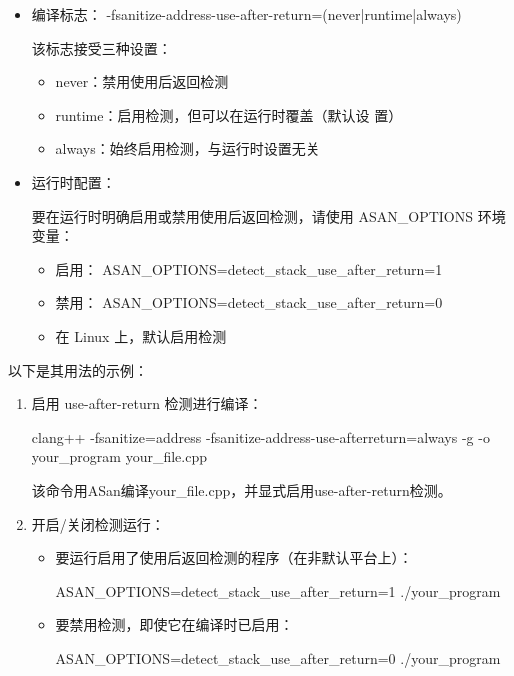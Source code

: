 \begin{itemize}
\item
编译标志： -fsanitize-address-use-after-return=(never|runtime|always)

该标志接受三种设置：

\begin{itemize}
\item
never：禁用使用后返回检测

\item
runtime：启用检测，但可以在运行时覆盖（默认设
置）

\item
always：始终启用检测，与运行时设置无关
\end{itemize}

\item
运行时配置：

要在运行时明确启用或禁用使用后返回检测，请使用 ASAN\_OPTIONS 环境变量：

\begin{itemize}
\item
启用： ASAN\_OPTIONS=detect\_stack\_use\_after\_return=1

\item
禁用： ASAN\_OPTIONS=detect\_stack\_use\_after\_return=0

\item
在 Linux 上，默认启用检测
\end{itemize}

\end{itemize}

以下是其用法的示例：

\begin{enumerate}
\item
启用 use-after-return 检测进行编译：

\begin{shell}
clang++ -fsanitize=address -fsanitize-address-use-afterreturn=always -g -o your_program your_file.cpp
\end{shell}

该命令用ASan编译your\_file.cpp，并显式启用use-after-return检测。

\item
开启/关闭检测运行：

\begin{itemize}
\item
要运行启用了使用后返回检测的程序（在非默认平台上）：

\begin{shell}
ASAN_OPTIONS=detect_stack_use_after_return=1 ./your_program
\end{shell}

\item
要禁用检测，即使它在编译时已启用：

\begin{shell}
ASAN_OPTIONS=detect_stack_use_after_return=0 ./your_program
\end{shell}
\end{itemize}
\end{enumerate}

